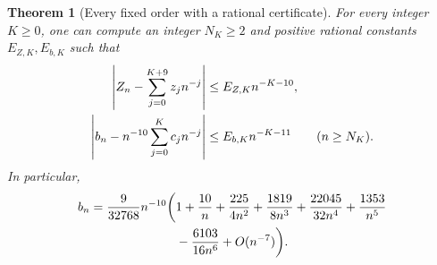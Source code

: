 \documentclass[11pt,letterpaper]{article}
\numberwithin{equation}{section}
\newtheorem{theorem}{Theorem}[section]
\theoremstyle{definition}
\newcommand{\1}{\mathbf 1}
\begin{document}
\begin{theorem}[Every fixed order with a rational certificate]
\label{shr:h5:asy:fixedorder}
For every integer $K\ge0$, one can compute an integer $N_K\ge2$ and
positive rational constants $E_{Z,K},E_{b,K}$ such that
\begin{align}
 \left|Z_n-\sum_{j=0}^{K+9}z_jn^{-j}\right|
 &\le E_{Z,K}n^{-K-10},\notag\\
 \left|b_n-n^{-10}\sum_{j=0}^Kc_jn^{-j}\right|
 &\le E_{b,K}n^{-K-11}\qquad(n\ge N_K).
 \label{shr:h5:asy:bounds}
\end{align}
In particular,
\begin{align}
 b_n=\frac9{32768}n^{-10}\bigg(&1+\frac{10}{n}
 +\frac{225}{4n^2}+\frac{1819}{8n^3}+\frac{22045}{32n^4}
 +\frac{1353}{n^5}\notag\\
 &-\frac{6103}{16n^6}+O(n^{-7})\bigg).
 \label{shr:h5:asy:bcoeffs}
\end{align}
\end{theorem}
\end{document}
